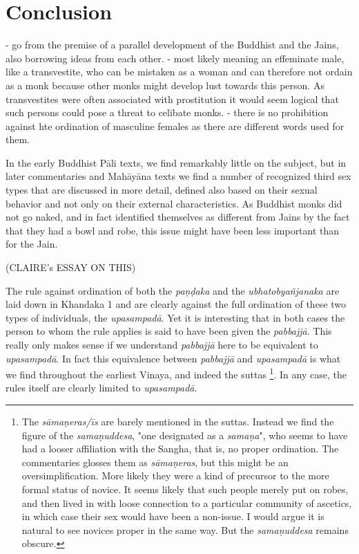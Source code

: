 \section{Conclusion}
- go from the premise of a parallel development of the Buddhist and the Jains, also borrowing ideas from each other.
- most likely meaning an effeminate male, like a transvestite, who can be mistaken as a woman and can therefore not ordain as a monk because other monks might develop lust towards this person. As transvestites were often associated with prostitution it would seem logical that such persons could pose a threat to celibate monks. 
- there is no prohibition against hte ordination of masculine females as there are different words used for them.

In the early Buddhist Pāli texts, we find remarkably little on the subject, but in later commentaries and Mahāyāna texts we find a number of recognized third sex types that are discussed in more detail, defined also based on their sexual behavior and not only on their external characteristics. As Buddhist monks did not go naked, and in fact identified themselves as different from Jains by the fact that they had a bowl and robe, this issue might have been less important than for the Jain.


(CLAIRE's ESSAY ON THIS)


The rule against ordination of both the {\em paṇḍaka } and the {\em ubhatob­yañ­janaka } are laid down in Khandaka 1 and are clearly against the full ordination of these two types of individuals, the {\em upasampadā}. Yet it is interesting that in both cases the person to whom the rule applies is said to have been given the {\em pabbajjā}. This really only makes sense if we understand {\em pabbajjā} here to be equivalent to {\em upasampadā}. In fact this equivalence between {\em pabbajjā} and {\em upasampadā} is what we find throughout the earliest Vinaya, and indeed the suttas \footnote{The {\em sāmaṇeras/īs} are barely mentioned in the suttas. Instead we find the figure of the {\em samaṇuddesa}, "one designated as a {\em samaṇa}", who seems to have had a looser affiliation with the Sangha, that is, no proper ordination. The commentaries glosses them as {\em sāmaṇeras}, but this might be an oversimplification. More likely they were a kind of precursor to the more formal status of novice. It seems likely that such people merely put on robes, and then lived in with loose connection to a particular community of ascetics, in which case their sex would have been a non-issue. I would argue it is natural to see novices proper in the same way. But the {\em samaṇuddesa} remains obscure.}. In any case, the rules itself are clearly limited to {\em upasampadā}.




